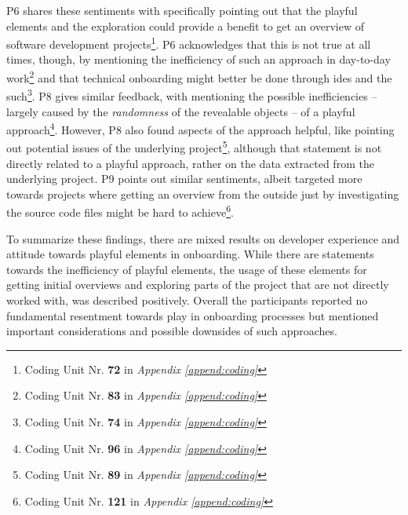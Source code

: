 P6 shares these sentiments with specifically pointing out that the playful elements and the exploration could provide a benefit to get an overview of software development projects\footnote{Coding Unit Nr. \textbf{72} in \textit{Appendix \ref{append:coding}}}. P6 acknowledges that this is not true at all times, though, by mentioning the inefficiency of such an approach in day-to-day work\footnote{Coding Unit Nr. \textbf{83} in \textit{Appendix \ref{append:coding}}} and that technical onboarding might better be done through \gls{ide}s and the such\footnote{Coding Unit Nr. \textbf{74} in \textit{Appendix \ref{append:coding}}}. P8 gives similar feedback, with mentioning the possible inefficiencies -- largely caused by the \textit{randomness} of the revealable objects -- of a playful approach\footnote{Coding Unit Nr. \textbf{96} in \textit{Appendix \ref{append:coding}}}. However, P8 also found aspects of the approach helpful, like pointing out potential issues of the underlying project\footnote{Coding Unit Nr. \textbf{89} in \textit{Appendix \ref{append:coding}}}, although that statement is not directly related to a playful approach, rather on the data extracted from the underlying project. P9 points out similar sentiments, albeit targeted more towards projects where getting an overview from the outside just by investigating the source code files might be hard to achieve\footnote{Coding Unit Nr. \textbf{121} in \textit{Appendix \ref{append:coding}}}.

To summarize these findings, there are mixed results on developer experience and attitude towards playful elements in onboarding. While there are statements towards the inefficiency of playful elements, the usage of these elements for getting initial overviews and exploring parts of the project that are not directly worked with, was described positively. Overall the participants reported no fundamental resentment towards play in onboarding processes but mentioned important considerations and possible downsides of such approaches.

